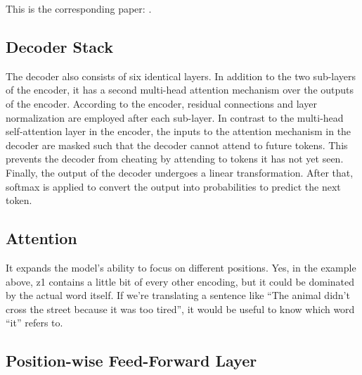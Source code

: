 This is the corresponding paper: \cite{he2015deepresiduallearningimage}.
\subsection{Decoder Stack} 
The decoder also consists of six identical layers.
In addition to the two sub-layers of the encoder, it has a second multi-head attention mechanism over the outputs of the encoder.
According to the encoder, residual connections and layer normalization are employed after each sub-layer.
In contrast to the multi-head self-attention layer in the encoder, the inputs to the attention mechanism in the decoder are masked such that the decoder cannot attend to future tokens.
This prevents the decoder from cheating by attending to tokens it has not yet seen.
Finally, the output of the decoder undergoes a linear transformation. After that, softmax is applied to convert the output into probabilities to predict the next token.


\subsection{Attention} 
It expands the model’s ability to focus on different positions.
Yes, in the example above, z1 contains a little bit of every other encoding, but it could be dominated by the actual word itself.
If we’re translating a sentence like “The animal didn’t cross the street because it was too tired”, it would be useful to know which word “it” refers to.

\subsection{Position-wise Feed-Forward Layer}

